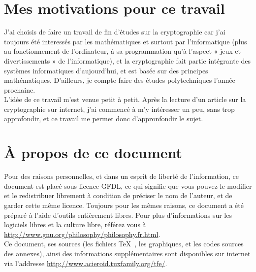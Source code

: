 
\section{Mes motivations pour ce travail}
J'ai choisis de faire un travail de fin d'études sur la cryptographie
car j'ai toujours été interessés par les mathématiques et surtout par
l'informatique (plus au fonctionnement de l'ordinateur, à sa
programmation qu'à l'aspect « jeux et divertissements » de
l'informatique), et la cryptographie fait partie intégrante des
systèmes informatiques d'aujourd'hui, et est basée sur des principes
mathématiques. D'ailleurs, je compte faire des études polytechniques
l'année prochaine. \\ L'idée de ce travail m'est venue petit à
petit. Après la lecture d'un article sur la cryptographie sur
internet, j'ai commencé à m'y intéresser un peu, sans trop
approfondir, et ce travail me permet donc
d'appronfondir le sujet.

\section{À propos de ce document} Pour des raisons personnelles, et
dans un esprit de liberté de l'information, ce document est placé sous
licence GFDL, ce qui signifie que vous pouvez le modifier et le
redistribuer librement à condition de préciser le nom de l'auteur, et
de garder cette même licence. Toujours pour les mêmes raisons, ce
document a été préparé à l'aide  d'outils entièrement libres.
 Pour plus d'informations sur les logiciels libres et la culture
libre, référez vous à \url{http://www.gnu.org/philosophy/philosophy.fr.html}. \\
Ce document, ses sources (les fichiers \TeX~, les graphiques, et les
codes sources des annexes), ainsi des informations supplémentaires
sont disponibles sur internet via l'addresse
\url{http://www.acieroid.tuxfamily.org/tfe/}. \\
